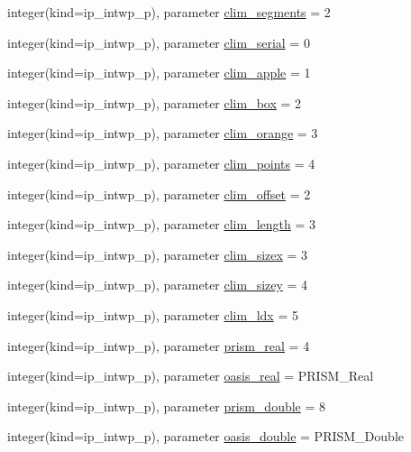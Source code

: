 \begin{DoxyCompactItemize}
\item 
integer(kind=ip\+\_\+intwp\+\_\+p), parameter \hyperlink{classmod__oasis__parameters_a7427036a6530871a0f49c0fb75f2b3ef}{clim\+\_\+segments} = 2
\item 
integer(kind=ip\+\_\+intwp\+\_\+p), parameter \hyperlink{classmod__oasis__parameters_a5c410369e763f9156d0ce1c82e866265}{clim\+\_\+serial} = 0
\item 
integer(kind=ip\+\_\+intwp\+\_\+p), parameter \hyperlink{classmod__oasis__parameters_a3cfd98fdd1c2fac653b182454c87f4aa}{clim\+\_\+apple} = 1
\item 
integer(kind=ip\+\_\+intwp\+\_\+p), parameter \hyperlink{classmod__oasis__parameters_a9a8b38629274e3a38a37f329ce9d2aa2}{clim\+\_\+box} = 2
\item 
integer(kind=ip\+\_\+intwp\+\_\+p), parameter \hyperlink{classmod__oasis__parameters_a17c74cc8141b595e448588b1add0f6bf}{clim\+\_\+orange} = 3
\item 
integer(kind=ip\+\_\+intwp\+\_\+p), parameter \hyperlink{classmod__oasis__parameters_aa9d90a3d7d5b21d2081a578dfea42fd4}{clim\+\_\+points} = 4
\item 
integer(kind=ip\+\_\+intwp\+\_\+p), parameter \hyperlink{classmod__oasis__parameters_a4cd07733eaf5d8c8148986c0c4217772}{clim\+\_\+offset} = 2
\item 
integer(kind=ip\+\_\+intwp\+\_\+p), parameter \hyperlink{classmod__oasis__parameters_a984896e821cbbb8c4a91e86ff19d54de}{clim\+\_\+length} = 3
\item 
integer(kind=ip\+\_\+intwp\+\_\+p), parameter \hyperlink{classmod__oasis__parameters_a4fb35a666ab4cec927a2ae9244535cb0}{clim\+\_\+sizex} = 3
\item 
integer(kind=ip\+\_\+intwp\+\_\+p), parameter \hyperlink{classmod__oasis__parameters_a206910560c246db3404224a04cfd4319}{clim\+\_\+sizey} = 4
\item 
integer(kind=ip\+\_\+intwp\+\_\+p), parameter \hyperlink{classmod__oasis__parameters_a3407c11054d24782182c649307808e47}{clim\+\_\+ldx} = 5
\item 
integer(kind=ip\+\_\+intwp\+\_\+p), parameter \hyperlink{classmod__oasis__parameters_a02e0627219e7769df37e3d55da46f65d}{prism\+\_\+real} = 4
\item 
integer(kind=ip\+\_\+intwp\+\_\+p), parameter \hyperlink{classmod__oasis__parameters_ae7760fcfae19d2f3cbf759688cd35193}{oasis\+\_\+real} = P\+R\+I\+S\+M\+\_\+\+Real
\item 
integer(kind=ip\+\_\+intwp\+\_\+p), parameter \hyperlink{classmod__oasis__parameters_a9527d2d640ea7d747143bf994ee9b206}{prism\+\_\+double} = 8
\item 
integer(kind=ip\+\_\+intwp\+\_\+p), parameter \hyperlink{classmod__oasis__parameters_a1071adbbf4c378907b4ff69dd53d0d7e}{oasis\+\_\+double} = P\+R\+I\+S\+M\+\_\+\+Double
\end{DoxyCompactItemize}


